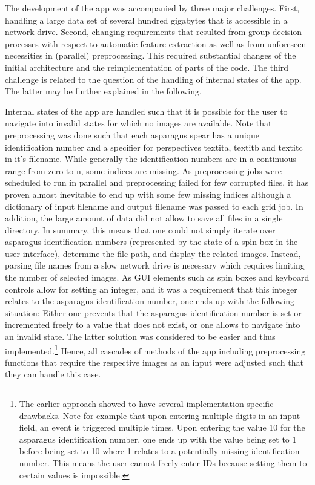 \bigskip
The development of the app was accompanied by three major challenges. First, handling a large data set of several hundred gigabytes that is accessible in a network drive. Second, changing requirements that resulted from group decision processes with respect to automatic feature extraction as well as from unforeseen necessities in (parallel) preprocessing. This required substantial changes of the initial architecture and the reimplementation of parts of the code. The third challenge is related to the question of the handling of internal states of the app. The latter may be further explained in the following. 

Internal states of the app are handled such that it is possible for the user to navigate into invalid states for which no images are available. Note that preprocessing was done such that each asparagus spear has a unique identification number and a specifier for perspectives textit{a}, textit{b} and textit{c} in it’s filename. While generally the identification numbers are in a continuous range from zero to n, some indices are missing. As preprocessing jobs were scheduled to run in parallel and preprocessing failed for few corrupted files, it has proven almost inevitable to end up with some few missing indices although a dictionary of input filename and output filename was passed to each grid job. In addition, the large amount of data did not allow to save all files in a single directory. In summary, this means that one could not simply iterate over asparagus identification numbers (represented by the state of a spin box in the user interface), determine the file path, and display the related images. Instead, parsing file names from a slow network drive is necessary which requires limiting the number of selected images. As GUI elements such as spin boxes and keyboard controls allow for setting an integer, and it was a requirement that this integer relates to the asparagus identification number, one ends up with the following situation: Either one prevents that the asparagus identification number is set or incremented freely to a value that does not exist, or one allows to navigate into an invalid state. The latter solution was considered to be easier and thus implemented.\footnote{The earlier approach showed to have several implementation specific drawbacks. Note for example that upon entering multiple digits in an input field, an event is triggered multiple times. Upon entering the value 10 for the asparagus identification number, one ends up with the value being set to 1 before being set to 10 where 1 relates to a potentially missing identification number. This means the user cannot freely enter IDs because setting them to certain values is impossible.} Hence, all cascades of methods of the app including preprocessing functions that require the respective images as an input were adjusted such that they can handle this case. 

